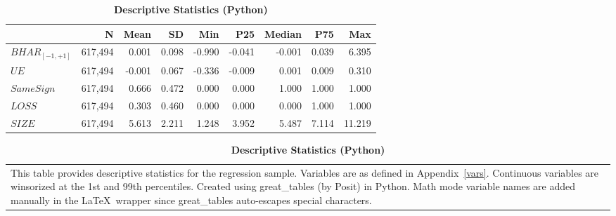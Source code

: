 \documentclass[english,12pt]{article}
\begin{document}
\begin{table}[htbp]\centering\footnotesize{
\renewcommand{\arraystretch}{1.5}
\caption{\textbf{Descriptive Statistics (Python)} \label{tab:descrip-py}}

\begin{tabular*}{\linewidth}{@{\extracolsep{\fill}}lrrrrrrrr}
\toprule
  & N & Mean & SD & Min & P25 & Median & P75 & Max \\
\midrule\addlinespace[2.5pt]
$BHAR_{[-1,+1]}$ & 617,494 & 0.001 & 0.098 & -0.990 & -0.041 & -0.001 & 0.039 & 6.395 \\
$UE$ & 617,494 & -0.001 & 0.067 & -0.336 & -0.009 & 0.001 & 0.009 & 0.310 \\
$SameSign$ & 617,494 & 0.666 & 0.472 & 0.000 & 0.000 & 1.000 & 1.000 & 1.000 \\
$LOSS$ & 617,494 & 0.303 & 0.460 & 0.000 & 0.000 & 0.000 & 1.000 & 1.000 \\
$SIZE$ & 617,494 & 5.613 & 2.211 & 1.248 & 3.952 & 5.487 & 7.114 & 11.219 \\
\bottomrule
\end{tabular*}

\vspace{-1.5\baselineskip}
\singlespace
\flushleft
\begin{tabular}{@{}p{\linewidth}@{}}
\footnotesize
This table provides descriptive statistics for the regression sample. Variables are as defined in Appendix~\ref{vars}. Continuous variables are winsorized at the 1st and 99th percentiles. Created using great\_tables (by Posit) in Python. Math mode variable names are added manually in the \LaTeX\ wrapper since great\_tables auto-escapes special characters.
\end{tabular}
}
\end{table}


\clearpage\newpage

\end{document}
